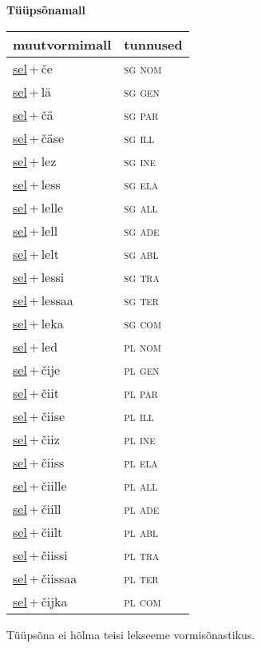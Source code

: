 
\vspace{1.8em}
\begin{minipage}{\textwidth}
\textbf{Tüüpsõnamall \,}\\

\begin{sideways}
\begin{tabular}{l l}
muutvormimall & tunnused \\
\hline
\underline{sel}\,+\,če & \textsc{ sg nom } \\
\underline{sel}\,+\,lä & \textsc{ sg gen } \\
\underline{sel}\,+\,čä & \textsc{ sg par } \\
\underline{sel}\,+\,čäse & \textsc{ sg ill } \\
\underline{sel}\,+\,lez & \textsc{ sg ine } \\
\underline{sel}\,+\,less & \textsc{ sg ela } \\
\underline{sel}\,+\,lelle & \textsc{ sg all } \\
\underline{sel}\,+\,lell & \textsc{ sg ade } \\
\underline{sel}\,+\,lelt & \textsc{ sg abl } \\
\underline{sel}\,+\,lessi & \textsc{ sg tra } \\
\underline{sel}\,+\,lessaa & \textsc{ sg ter } \\
\underline{sel}\,+\,leka & \textsc{ sg com } \\
\underline{sel}\,+\,led & \textsc{ pl nom } \\
\underline{sel}\,+\,čije & \textsc{ pl gen } \\
\underline{sel}\,+\,čiit & \textsc{ pl par } \\
\underline{sel}\,+\,čiise & \textsc{ pl ill } \\
\underline{sel}\,+\,čiiz & \textsc{ pl ine } \\
\underline{sel}\,+\,čiiss & \textsc{ pl ela } \\
\underline{sel}\,+\,čiille & \textsc{ pl all } \\
\underline{sel}\,+\,čiill & \textsc{ pl ade } \\
\underline{sel}\,+\,čiilt & \textsc{ pl abl } \\
\underline{sel}\,+\,čiissi & \textsc{ pl tra } \\
\underline{sel}\,+\,čiissaa & \textsc{ pl ter } \\
\underline{sel}\,+\,čijka & \textsc{ pl com } \\
\end{tabular}
\end{sideways}
\label{tab:tüüpsõnamall-selče}

\end{minipage}

 
\vspace{1em}
\noindent Tüüpsõna ei hõlma teisi lekseeme vormi\-sõnastikus.
